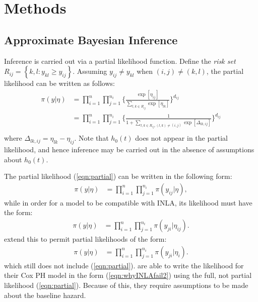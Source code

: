 \documentclass[ba]{imsart}
\begin{document}
\section{Methods}\label{sec:method}


\subsection{Approximate Bayesian Inference}

Inference is carried out via a partial likelihood function. Define the \textit{risk set} $R_{ij} = \left\{k,l : y_{kl} \geq y_{ij}\right\}$. Assuming $y_{ij} \neq y_{kl}$ when $(i,j) \neq (k,l)$, the partial likelihood can be written as follows: 
\begin{equation}\begin{aligned}\label{eqn:partial}
\pi(y|\eta) &= \prod_{i=1}^{n}\prod_{j=1}^{n_{i}} \bigg\{\frac{\exp[\eta_{ij}]}{{\sum_{l,k\in R_{ij}}^{}\exp[\eta_{lk}]}}\bigg \}^{d_{ij}} \\
&= \prod_{i=1}^{n}\prod_{j=1}^{n_{i}} \bigg\{\frac{1}{{1 + \sum_{l,k\in R_{ij} , (l,k) \neq (i,j)}\exp[\Delta_{lk,ij}]}}\bigg \}^{d_{ij}} \\
\end{aligned}\end{equation}
where $\Delta_{lk,ij} = \eta_{lk} - \eta_{ij}$. Note that $h_{0}(t)$ does not appear in the partial likelihood, and hence inference may be carried out in the absence of assumptions about $h_{0}(t)$. 

The partial likelihood (\ref{eqn:partial}) can be written in the following form:
\begin{equation}\begin{aligned}\label{eqn:whyINLAfail1}
\pi(y|\eta) &= \prod_{i=1}^{n}\prod_{j=1}^{n_{i}} \pi(y_{ij}|\eta),
\end{aligned}\end{equation}
while in order for a model to be compatible with INLA, its likelihood must have the form:
\begin{equation}\begin{aligned}\label{eqn:whyINLAfail2}
\pi(y|\eta) &= \prod_{i=1}^{n}\prod_{j=1}^{n_{i}} \pi(y_{ji}|\eta_{ij}).
\end{aligned}\end{equation}
\cite{casecross} extend this to permit partial likelihoods of the form:
\begin{equation}\begin{aligned}\label{eqn:casecrosslik}
\pi(y|\eta) &= \prod_{i=1}^{n}\prod_{j=1}^{n_{i}} \pi(y_{ji}|\eta_{i}).
\end{aligned}\end{equation}
which still does not include (\ref{eqn:partial}). \cite{inlacoxph} are able to write the likelihood for their Cox PH model in the form (\ref{eqn:whyINLAfail2}) using the full, not partial likelihood (\ref{eqn:partial}). Because of this, they require assumptions to be made about the baseline hazard.
\end{document}

